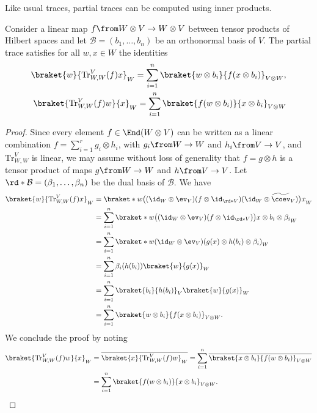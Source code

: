 \documentclass[a4paper,oneside, 12pt]{amsart}
\begin{document}
Like usual traces, partial traces can be computed using inner products.

\begin{lemma}\label{lem:how-to-compute-partial-traces}
  Consider a linear map \(f\from W\otimes V \to W \otimes V\) between tensor products of Hilbert spaces and let \(\mathcal{B} = (b_{1}, \dots , b_{n})\) be an orthonormal basis of \(V\).
  The partial trace satisfies for all  \(w,x \in W\) the identities
  \begin{subequations}
    \begin{align}
      \braket{w}{\mathrm{Tr}_{W,W}^{V}(f) x}_{W}
      = \sum_{i=1}^{n} \braket{w \otimes b_{i}}{f(x\otimes b_{i})}_{V\otimes W},\\
      \braket{\mathrm{Tr}_{W,W}^{V}(f)w}{x}_{W}
      = \sum_{i=1}^{n} \braket{f(w \otimes b_{i})}{x\otimes b_{i}}_{V\otimes W}
    \end{align}
  \end{subequations}
\end{lemma}
\begin{proof}
  Since every element \( f\in \End(W\otimes V)\) can be written as a linear combination \(f= \sum_{i=1}^{r} g_{i}\otimes h_{i}\), with \(g_{i} \from W \to W\) and \(h_{i} \from V\to V\), and  \(\mathrm{Tr}_{W,W}^{V}\) is linear, we may assume without loss of generality that \(f = g\otimes h\) is a tensor product of maps \(g\from W\to W\) and \(h \from V \to V\).
  Let \(\rd*{ \mathcal{B}} = (\beta_{1}, \dots , \beta_{n})\) be the dual basis of \(\mathcal{B}\).
  We have
  \begin{align*}
    \braket{w}{\mathrm{Tr}_{W,W}^{V}(f) x}_{W}
    & = \braket*{w}{\big((\id_{W} \otimes \ev_{V}) (f\otimes \id_{\rd*{V}}) (\id_{W}\otimes \widetilde{\coev}_{V})\big) x}_{W}\\
    & = \sum_{i=1}^{n} \braket*{w}{\big((\id_{W} \otimes \ev_{V}) (f\otimes \id_{\rd*{V}})\big) x\otimes b_{i} \otimes \beta_{i}}_{W} \\
    & = \sum_{i=1}^{n} \braket*{w}{(\id_{W} \otimes \ev_{V}) (g(x) \otimes h(b_{i}) \otimes \beta_{i})}_{W} \\
    & = \sum_{i=1}^{n} \beta_{i}(h(b_{i})) \braket{w}{g(x)}_{W}\\
    & = \sum_{i=1}^{n} \braket{b_{i}}{h(b_{i})}_{V} \braket{w}{g(x)}_{W} \\
    & = \sum_{i=1}^{n} \braket{w \otimes b_{i}}{f(x \otimes b_{i})}_{V\otimes W}.
  \end{align*}
  We conclude the proof by noting
  \begin{align*}
    \braket{\mathrm{Tr}_{W,W}^{V}(f)w}{x}_{W}
    & = \overline{\braket{x}{\mathrm{Tr}_{W,W}^{V}(f)w}_{W}}
      = \sum_{i=1}^{n} \overline{\braket{x \otimes b_{i}}{f(w \otimes b_{i})}_{V\otimes W}} \\
    & = \sum_{i=1}^{n} \braket{f(w \otimes b_{i})}{x \otimes b_{i}}_{V\otimes W}. \qedhere
  \end{align*}
\end{proof}
\end{document}
